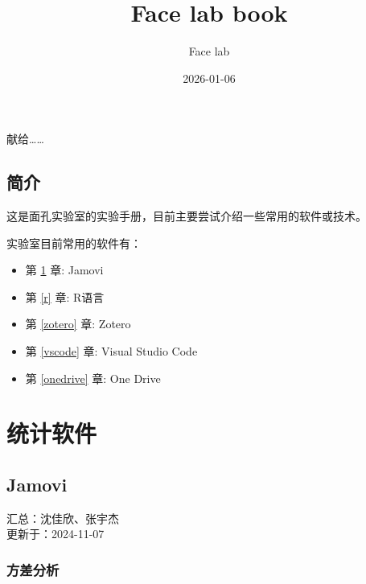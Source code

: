 \documentclass[]{ctexbook}
\title{Face lab book}
\author{Face lab}
\date{2026-01-06}
\providecommand{\tightlist}{%
  \setlength{\itemsep}{0pt}\setlength{\parskip}{0pt}}
\theoremstyle{definition}
\theoremstyle{definition}
\theoremstyle{definition}
\theoremstyle{definition}
\theoremstyle{remark}
\begin{document}
\maketitle


\thispagestyle{empty}

\begin{center}
献给……

\end{center}

\setlength{\abovedisplayskip}{-5pt}
\setlength{\abovedisplayshortskip}{-5pt}

{
\setcounter{tocdepth}{2}
\tableofcontents
}
\listoftables
\listoffigures
\chapter{简介}\label{ux7b80ux4ecb}

这是面孔实验室的实验手册，目前主要尝试介绍一些常用的软件或技术。

实验室目前常用的软件有：

\begin{itemize}
\tightlist
\item
  第 \ref{jamovi} 章: Jamovi\\
\item
  第 \ref{r} 章: R语言\\
\item
  第 \ref{zotero} 章: Zotero
\item
  第 \ref{vscode} 章: Visual Studio Code\\
\item
  第 \ref{onedrive} 章: One Drive
\end{itemize}

\mainmatter

\part{统计软件}\label{part-ux7edfux8ba1ux8f6fux4ef6}

\chapter{Jamovi}\label{jamovi}

汇总：沈佳欣、张宇杰\\
更新于：2024-11-07

\section{方差分析}\label{ux65b9ux5deeux5206ux6790}
\end{document}
